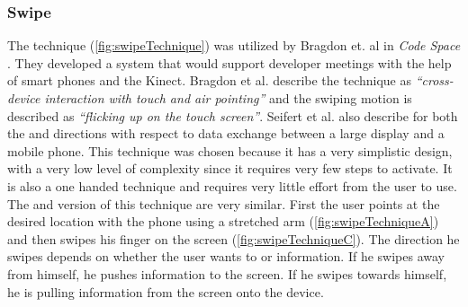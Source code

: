 \subsubsection{Swipe} \label{sec:swipeTechnique}
The \swipe technique (\cref{fig:swipeTechnique}) was utilized by Bragdon et. al in \emph{Code Space} \cite{Bragdon:2011}.
They developed a system that would support developer meetings with the help of smart phones and the Kinect. 
Bragdon et al. describe the technique as \emph{``cross-device interaction with touch and air pointing''} and the swiping motion is described as \emph{``flicking up on the touch screen''}.
Seifert et al. \cite{Seifert:2013} also describe \swipe for both the \push and \pull directions with respect to data exchange between a large display and a mobile phone.
This technique was chosen because it has a very simplistic design, with a very low level of complexity since it requires very few steps to activate.
It is also a one handed technique and requires very little effort from the user to use.
The \push and \pull version of this technique are very similar.
First the user points at the desired location with the phone using a stretched arm (\cref{fig:swipeTechniqueA}) and then swipes his finger on the screen (\cref{fig:swipeTechniqueC}).
The direction he swipes depends on whether the user wants to \push or \pull information.
If he swipes away from himself, he pushes information to the screen.
If he swipes towards himself, he is pulling information from the screen onto the device.  

